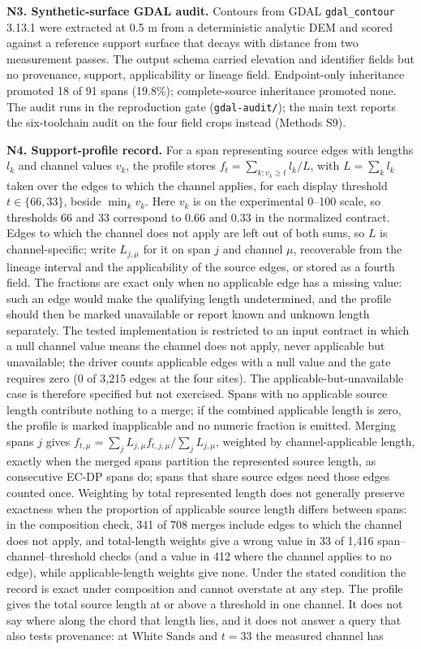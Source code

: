 \documentclass[11pt]{article}
\begin{document}
\vspace{4mm}
\noindent\textbf{N3. Synthetic-surface GDAL audit.} Contours from GDAL \texttt{gdal\_contour} 3.13.1 were extracted at 0.5 m from a deterministic analytic DEM and scored against a reference support surface that decays with distance from two measurement passes. The output schema carried elevation and identifier fields but no provenance, support, applicability or lineage field. Endpoint-only inheritance promoted 18 of 91 spans (19.8\%); complete-source inheritance promoted none. The audit runs in the reproduction gate (\texttt{gdal-audit/}); the main text reports the six-toolchain audit on the four field crops instead (Methods S9).

\vspace{4mm}
\noindent\textbf{N4. Support-profile record.} For a span representing source edges with lengths $l_k$ and channel values $v_k$, the profile stores $f_t=\sum_{k:v_k\ge t} l_k/L$, with $L=\sum_k l_k$ taken over the edges to which the channel applies, for each display threshold $t\in\{66,33\}$, beside $\min_k v_k$. Here $v_k$ is on the experimental 0--100 scale, so thresholds 66 and 33 correspond to 0.66 and 0.33 in the normalized contract. Edges to which the channel does not apply are left out of both sums, so $L$ is channel-specific; write $L_{j,\mu}$ for it on span $j$ and channel $\mu$, recoverable from the lineage interval and the applicability of the source edges, or stored as a fourth field. The fractions are exact only when no applicable edge has a missing value: such an edge would make the qualifying length undetermined, and the profile should then be marked unavailable or report known and unknown length separately. The tested implementation is restricted to an input contract in which a null channel value means the channel does not apply, never applicable but unavailable; the driver counts applicable edges with a null value and the gate requires zero (0 of 3,215 edges at the four sites). The applicable-but-unavailable case is therefore specified but not exercised. Spans with no applicable source length contribute nothing to a merge; if the combined applicable length is zero, the profile is marked inapplicable and no numeric fraction is emitted. Merging spans $j$ gives $f_{t,\mu}=\sum_j L_{j,\mu}f_{t,j,\mu}/\sum_j L_{j,\mu}$, weighted by channel-applicable length, exactly when the merged spans partition the represented source length, as consecutive EC-DP spans do; spans that share source edges need those edges counted once. Weighting by total represented length does not generally preserve exactness when the proportion of applicable source length differs between spans: in the composition check, 341 of 708 merges include edges to which the channel does not apply, and total-length weights give a wrong value in 33 of 1,416 span--channel--threshold checks (and a value in 412 where the channel applies to no edge), while applicable-length weights give none. Under the stated condition the record is exact under composition and cannot overstate at any step. The profile gives the total source length at or above a threshold in one channel. It does not say where along the chord that length lies, and it does not answer a query that also tests provenance: at White Sands and $t=33$ the measured channel has 
\end{document}
